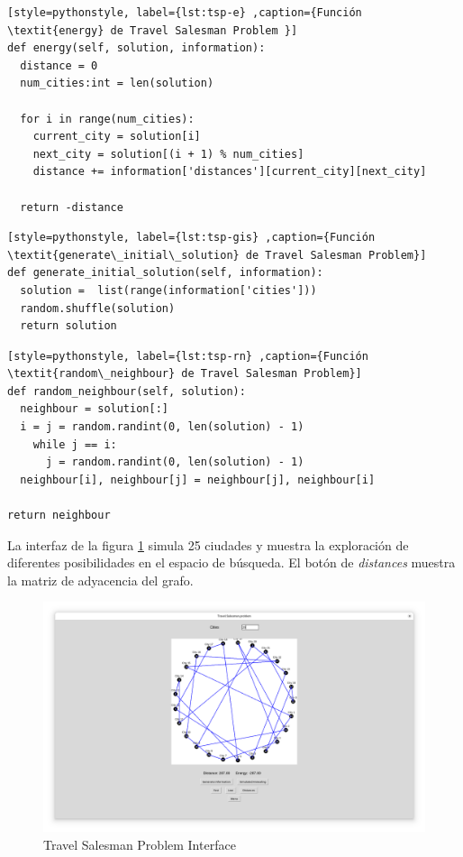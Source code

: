 \documentclass[12pt,twoside]{article}
\begin{document}
\begin{lstlisting}[style=pythonstyle, label={lst:tsp-e} ,caption={Función \textit{energy} de Travel Salesman Problem }]
def energy(self, solution, information):
  distance = 0
  num_cities:int = len(solution)

  for i in range(num_cities):
	current_city = solution[i]
	next_city = solution[(i + 1) % num_cities]  
	distance += information['distances'][current_city][next_city]

  return -distance
\end{lstlisting}

\begin{lstlisting}[style=pythonstyle, label={lst:tsp-gis} ,caption={Función \textit{generate\_initial\_solution} de Travel Salesman Problem}]
def generate_initial_solution(self, information):
  solution =  list(range(information['cities']))
  random.shuffle(solution)
  return solution     
\end{lstlisting}

\begin{lstlisting}[style=pythonstyle, label={lst:tsp-rn} ,caption={Función \textit{random\_neighbour} de Travel Salesman Problem}]
def random_neighbour(self, solution):
  neighbour = solution[:]
  i = j = random.randint(0, len(solution) - 1)
 	while j == i:
	  j = random.randint(0, len(solution) - 1)
  neighbour[i], neighbour[j] = neighbour[j], neighbour[i]

return neighbour
\end{lstlisting}

La interfaz de la figura \ref{fig:tsp} simula 25 ciudades y muestra la exploración de diferentes posibilidades en el espacio de búsqueda. El botón de \textit{distances} muestra la matriz de adyacencia del grafo.

\begin{figure}[h!]
	\centering
	\includegraphics[width=\linewidth]{img/tsp}
	\caption{Travel Salesman Problem Interface}
	\label{fig:tsp}
\end{figure}
\end{document}
